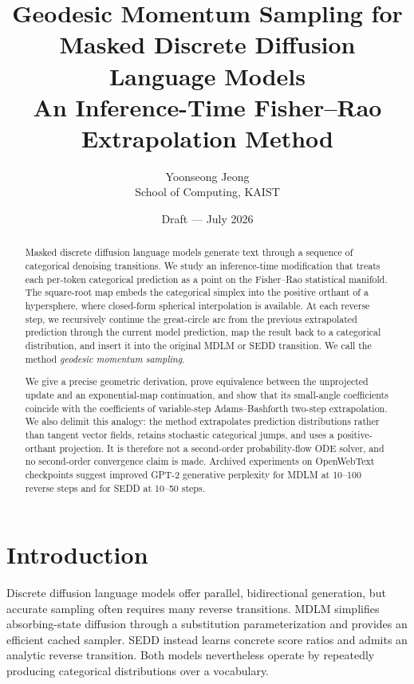 \documentclass[10pt]{article}
\title{\textbf{Geodesic Momentum Sampling for Masked Discrete Diffusion Language Models}\\
\large An Inference-Time Fisher--Rao Extrapolation Method}
\author{Yoonseong Jeong\\School of Computing, KAIST}
\date{Draft --- July 2026}
\begin{document}
\maketitle

\begin{abstract}
Masked discrete diffusion language models generate text through a sequence of categorical denoising
transitions.  We study an inference-time modification that treats each per-token categorical prediction
as a point on the Fisher--Rao statistical manifold.  The square-root map embeds the categorical simplex
into the positive orthant of a hypersphere, where closed-form spherical interpolation is available.  At
each reverse step, we recursively continue the great-circle arc from the previous extrapolated prediction
through the current model prediction, map the result back to a categorical distribution, and insert it
into the original MDLM or SEDD transition.  We call the method \emph{geodesic momentum sampling}.

We give a precise geometric derivation, prove equivalence between the unprojected update and an
exponential-map continuation, and show that its small-angle coefficients coincide with the coefficients
of variable-step Adams--Bashforth two-step extrapolation.  We also delimit this analogy: the method
extrapolates prediction distributions rather than tangent vector fields, retains stochastic categorical
jumps, and uses a positive-orthant projection.  It is therefore not a second-order probability-flow ODE
solver, and no second-order convergence claim is made.  Archived experiments on OpenWebText
checkpoints suggest improved GPT-2 generative perplexity for MDLM at 10--100 reverse steps and for SEDD
at 10--50 steps.
\end{abstract}

\section{Introduction}

Discrete diffusion language models offer parallel, bidirectional generation, but accurate sampling often
requires many reverse transitions.  MDLM \citep{sahoo2024mdlm} simplifies absorbing-state diffusion
through a substitution parameterization and provides an efficient cached sampler.  SEDD
\citep{lou2024sedd} instead learns concrete score ratios and admits an analytic reverse transition.
Both models nevertheless operate by repeatedly producing categorical distributions over a vocabulary.
\end{document}
